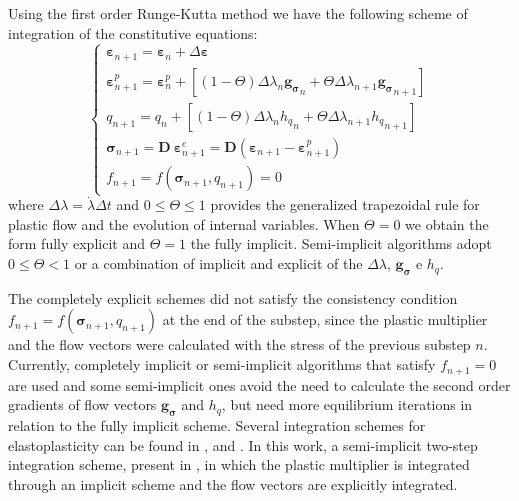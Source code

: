 \documentclass[Journal,letterpaper]{ascelike-new}
\newcommand{\Dsdee}{\boldsymbol{D}}
\newcommand{\hl}{{h_q}}
\newcommand{\dgds}{\boldsymbol{g_\sigma}}
\newcommand{\strain}{\boldsymbol{\varepsilon}}
\newcommand{\stress}{\boldsymbol{\sigma}}
\begin{document}
Using the first order Runge-Kutta method we have the following scheme of integration of the constitutive equations:
\begin{equation}
	\label{eq:esquema_int_constitutiva_ep}
	\left\{
\begin{array}{lcl}
	\strain_{n+1} = \strain_n + \Delta \strain \\
	\strain_{n+1}^p = \strain_n^p + \left[(1-\Theta) \Delta \lambda_n \dgds_n + \Theta \Delta \lambda_{n+1} \dgds_{n+1}\right] \\
	q_{n+1} = q_n + \left[(1-\Theta) \Delta \lambda_n \hl_n + \Theta \Delta \lambda_{n+1} \hl_{n+1}\right] \\	
	\stress_{n+1} = \Dsdee~\strain_{n+1}^e = \Dsdee( \strain_{n+1} - \strain_{n+1}^p) \\
	f_{n+1} = f(\stress_{n+1},q_{n+1}) = 0		
\end{array}
\right.
\end{equation}
where $\Delta \lambda = \dot\lambda\Delta t$ and $0 \leq \Theta \leq 1$ provides the generalized trapezoidal rule for  plastic flow and the evolution of internal variables. When $\Theta = 0$ we obtain the form fully explicit and $\Theta = 1$ the fully implicit. Semi-implicit algorithms adopt $0 \leq \Theta < 1$ or a combination of implicit and explicit of the $\Delta \lambda$, $\dgds$ e $\hl$. 

The completely explicit schemes did not satisfy the consistency condition $f_{n+1}=f(\stress_{n+1},q_{n+1})$ at the end of the substep, since the plastic multiplier and the flow vectors were calculated with the stress of the previous substep $n$. Currently, completely implicit or semi-implicit algorithms that satisfy $f_{n+1} = 0$ are used and some semi-implicit ones avoid the need to calculate the second order gradients of flow vectors $\dgds$ and $\hl$, but need more equilibrium iterations in relation to the fully implicit scheme. Several integration schemes for elastoplasticity can be found in ,  and . In this work, a semi-implicit two-step integration scheme, present in , in which the plastic multiplier is integrated through an implicit scheme and the flow vectors are explicitly integrated.
\end{document}
